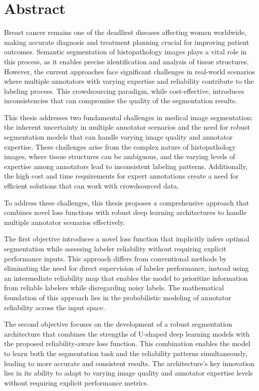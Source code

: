 \cleardoublepage
\chapter*{Abstract}

Breast cancer remains one of the deadliest diseases affecting women
worldwide, making accurate diagnosis and treatment planning crucial
for improving patient outcomes. Semantic segmentation of
histopathology images plays a vital role in this process, as it
enables precise identification and analysis of tissue structures.
However, the current approaches face significant challenges in
real-world scenarios where multiple annotators with varying expertise
and reliability contribute to the labeling process. This
crowdsourcing paradigm, while cost-effective, introduces
inconsistencies that can compromise the quality of the segmentation results.

This thesis addresses two fundamental challenges in medical image
segmentation: the inherent uncertainty in multiple annotator
scenarios and the need for robust segmentation models that can handle
varying image quality and annotator expertise. These challenges arise
from the complex nature of histopathology images, where tissue
structures can be ambiguous, and the varying levels of expertise
among annotators lead to inconsistent labeling patterns.
Additionally, the high cost and time requirements for expert
annotations create a need for efficient solutions that can work with
crowdsourced data.

To address these challenges, this thesis proposes a comprehensive
approach that combines novel loss functions with robust deep learning
architectures to handle multiple annotator scenarios effectively.

The first objective introduces a novel loss function that implicitly
infers optimal segmentation while assessing labeler reliability
without requiring explicit performance inputs. This approach differs
from conventional methods by eliminating the need for direct
supervision of labeler performance, instead using an intermediate
reliability map that enables the model to prioritize information from
reliable labelers while disregarding noisy labels. The mathematical
foundation of this approach lies in the probabilistic modeling of
annotator reliability across the input space.

The second objective focuses on the development of a robust
segmentation architecture that combines the strengths of U-shaped
deep learning models with the proposed reliability-aware loss
function. This combination enables the model to learn both the
segmentation task and the reliability patterns simultaneously,
leading to more accurate and consistent results. The architecture's
key innovation lies in its ability to adapt to varying image quality
and annotator expertise levels without requiring explicit performance metrics.

